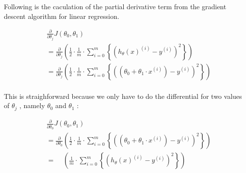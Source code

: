 


Following is the caculation of the partial derivative term from the
gradient descent algorithm for linear regression.

\[
\begin{aligned}
	&\frac{\partial}{\partial \theta_j}
	J(\theta_{0}, \theta_{1}) \\
	& =
	\frac{\partial}{\partial \theta_j}
	\left(
		\frac{1}{2}
		\cdot \frac{1}{m}
		\cdot \sum_{i=0}^{m}
			\left\{
				\left(
					h_{\theta}(x)^{(i)} - y^{(i)}
				\right)^{2}
			\right\}
	\right)
	\\
	& =
	\frac{\partial}{\partial \theta_j}
	\left(
		\frac{1}{2}
		\cdot \frac{1}{m}
		\cdot \sum_{i=0}^{m}
			\left\{
				\left(
					\left(
						\theta_{0} + \theta_{1} \cdot x^{(i)}
					\right)
					- y^{(i)}
				\right)^{2}
			\right\}
	\right)
	\\
\end{aligned}
\]

This is straighforward because we only have to do the differential for two
values of $\theta_j$ , namely $\theta_0$ and $\theta_1$ : 

\[
\begin{aligned}
	& \frac{\partial}{\partial \theta_0} J(\theta_{0}, \theta_{1}) \\
	& =
	\frac{\partial}{\partial \theta_0}
	\left(
		\frac{1}{2}
		\cdot \frac{1}{m}
		\cdot \sum_{i=0}^{m}
			\left\{
				\left(
					\left(
						\theta_{0} + \theta_{1} \cdot x^{(i)}
					\right)
					- y^{(i)}
				\right)^{2}
			\right\}
	\right)
	\\
	& =
	\phantom{ \frac{\partial}{\partial \theta_0} }
	\left(
		\frac{1}{m}
		\cdot \sum_{i=0}^{m}
			\left\{
				\left(
					h_{\theta}(x)^{(i)} - y^{(i)}
				\right)^{2}
			\right\}
	\right)
	\\
\end{aligned}
\]

